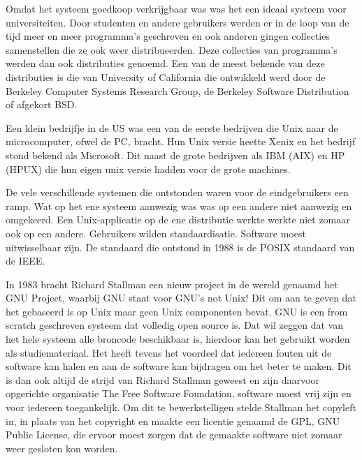 Omdat het systeem goedkoop verkrijgbaar was was het een ideaal systeem voor universiteiten. Door studenten en andere
gebruikers werden er in de loop van de tijd meer en meer programma's geschreven en ook anderen gingen collecties
samenstellen die ze ook weer distribueerden. Deze collecties van programma's werden dan ook distributies genoemd. Een
van de meest bekende van deze distributies is die van University of California die ontwikkeld werd door de Berkeley
Computer Systems Research Group, de Berkeley Software Distribution of afgekort BSD.\par

Een klein bedrijfje in de US was een van de eerste bedrijven die Unix naar de microcomputer, ofwel de PC, bracht. Hun
Unix versie heette Xenix en het bedrijf stond bekend als Microsoft. Dit naast de grote bedrijven als IBM (AIX) en HP
(HPUX) die hun eigen unix versie hadden voor de grote machines.\par

De vele verschillende systemen die ontstonden waren voor de eindgebruikers een ramp. Wat op het ene systeem aanwezig was
was op een andere niet aanwezig en omgekeerd. Een Unix-applicatie op de ene distributie werkte werkte niet zomaar ook
op een andere. Gebruikers wilden standaardisatie. Software moest uitwisselbaar zijn. De standaard die ontstond in 1988
is de POSIX standaard van de IEEE.\par

In 1983 bracht Richard Stallman een nieuw project in de wereld genaamd het GNU Project, waarbij GNU staat
voor GNU's not Unix! Dit om aan te geven dat het gebaseerd is op Unix maar geen Unix componenten bevat. GNU is een from
scratch geschreven systeem dat volledig open source is. Dat wil zeggen dat van het hele systeem alle broncode
beschikbaar is, hierdoor kan het gebruikt worden als studiemateriaal. Het heeft tevens het voordeel dat iedereen fouten
uit de software kan halen en aan de software kan bijdragen om het beter te maken. Dit is dan ook altijd de strijd van
Richard Stallman geweest en zijn daarvoor opgerichte organisatie The Free Software
Foundation, software moest vrij zijn en voor iedereen toegankelijk. Om dit te bewerkstelligen stelde Stallman het
copyleft in, in plaats van het copyright en maakte een licentie genaamd de GPL, GNU Public
License, die ervoor moest zorgen dat de gemaakte software niet zomaar weer gesloten kon worden.\par


